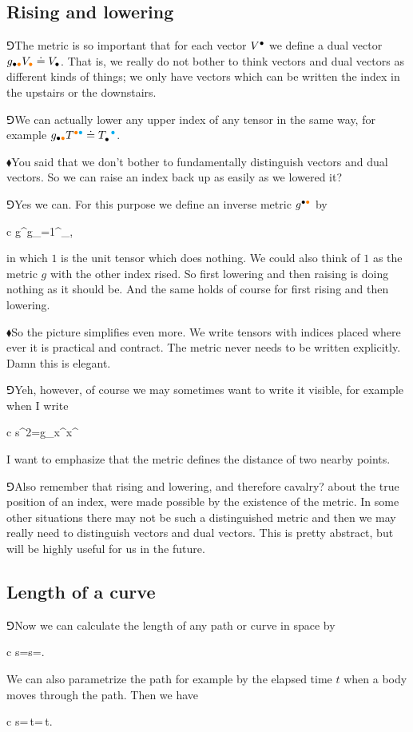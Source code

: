 \documentclass[10pt,oneside%
]{memoir}
\newenvironment{eqna}{\begin{IEEEeqnarray*}{c}}{\end{IEEEeqnarray*}\ignorespacesafterend}
\newcommand{\der}[2]{\frac{\dd#1}{\dd#2}}
\newcommand{\dd}{\mathrm{d}}
\newcommand{\tensay}[3]{#1_{#2}^{\phantom{#2}#3}}
\newcommand{\hea}{\(\blacklozenge\)\;}
\newcommand{\heb}{\(\Game\)\;}
\newcommand{\coa}{{\color{black}\bullet}}
\newcommand{\cob}{{\color{oranssi}\bullet}}
\newcommand{\coc}{{\color{cyan}\bullet}}
\begin{document}
\subsection{Rising and lowering}
\heb The metric is so important that for each vector \(V^\coa\) we define a dual vector \(g_{\coa\cob}V_\cob\doteq V_\coa\). That is, we really do not bother to think vectors and dual vectors as different kinds of things; we only have vectors which can be written the index in the upstairs or the downstairs.

\heb We can actually lower any upper index of any tensor in the same way, for example \(g_{\coa\cob}T^{\cob\coc}\doteq\tensay{T}{\coa}{\coc}\).

\hea You said that we don't bother to fundamentally distinguish vectors and dual vectors. So we can raise an index back up as easily as we lowered it?

\heb Yes we can. For this purpose we define an inverse metric \(g^{\coa\cob}\) by
\begin{eqna}
    g^{\coa\cob}g_{\cob\coc}=1^{\coa}_{\coc},
\end{eqna}
in which \(1\) is the unit tensor which does nothing. We could also think of \(1\) as the metric \(g\) with the other index rised. So first lowering and then raising is doing nothing as it should be. And the same holds of course for first rising and then lowering.

\hea So the picture simplifies even more. We write tensors with indices placed where ever it is practical and contract. The metric never needs to be written explicitly. Damn this is elegant.

\heb Yeh, however, of course we may sometimes want to write it visible, for example when I write
\begin{eqna}
    \dd s^2=g_{\coa\cob}\dd x^\coa\dd x^\cob
\end{eqna}
I want to emphasize that the metric defines the distance of two nearby points.

\heb Also remember that rising and lowering, and therefore cavalry? about the true position of an index, were made possible by the existence of the metric. In some other situations there may not be such a distinguished metric and then we may really need to distinguish vectors and dual vectors. This is pretty abstract, but will be highly useful for us in the future.
\subsection{Length of a curve}
\heb Now we can calculate the length of any path or curve in space by
\begin{eqna}
    s=\int\dd s=\int\sqrt{g_{\coa\cob}\dd x^\coa\dd x^\cob}.
\end{eqna}
We can also parametrize the path for example by the elapsed time \(t\) when a body moves through the path. Then we have
\begin{eqna}
    s=\int\sqrt{g_{\coa\cob}\der{x^\coa}{t}\der{x^\cob}{t}}\,\dd t=\int\sqrt{g_{\coa\cob}\dot{x}^\coa\dot{x}^\cob}\,\dd t.
\end{eqna}
\end{document}
